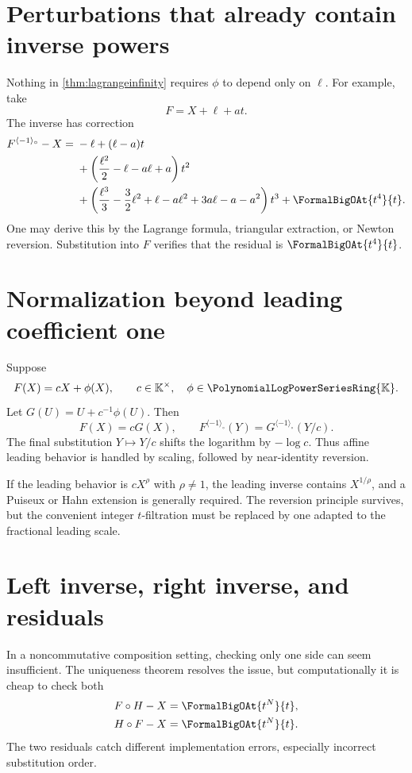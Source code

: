 \documentclass[11pt,oneside,openany]{book}
\newcommand{\K}{\mathbb{K}}
\newcommand{\Rring}{\PolynomialLogPowerSeriesRing{\K}}
\newcommand{\compose}{\mathbin{\circ}}
\newcommand{\rev}{^{\langle-1\rangle_{\circ}}}
\begin{document}
\section{Perturbations that already contain inverse powers}
Nothing in \cref{thm:lagrangeinfinity} requires \(\phi\) to depend only on
\(\ell\).  For example, take
\begin{equation}\label{eq:phiwitha}
 F=X+\ell+a t.
\end{equation}
The inverse has correction
\begin{align}
 F\rev-X={}&-\ell+(\ell-a)t\notag\\
 &+\left(\frac{\ell^2}{2}-\ell-a\ell+a\right)t^2\notag\\
 &+\left(
   \frac{\ell^3}{3}-\frac32\ell^2+\ell
   -a\ell^2+3a\ell-a-a^2
   \right)t^3
 +\FormalBigOAt{t^4}{t}.
 \label{eq:inversewitha}
\end{align}
One may derive this by the Lagrange formula, triangular extraction, or Newton
reversion.  Substitution into \(F\) verifies that the residual is
\(\FormalBigOAt{t^4}{t}\).

\section{Normalization beyond leading coefficient one}
Suppose
\begin{equation}\label{eq:affineleading}
 F(X)=cX+\phi(X),
 \qquad c\in\K^\times,
 \quad \phi\in\Rring.
\end{equation}
Let \(G(U)=U+c^{-1}\phi(U)\).  Then
\[
 F(X)=cG(X),
 \qquad
 F\rev(Y)=G\rev(Y/c).
\]
The final substitution \(Y\mapsto Y/c\) shifts the logarithm by
\(-\log c\).  Thus affine leading behavior is handled by scaling, followed by
near-identity reversion.

If the leading behavior is \(cX^\rho\) with \(\rho\neq1\), the leading inverse
contains \(X^{1/\rho}\), and a Puiseux or Hahn extension is generally required.
The reversion principle survives, but the convenient integer \(t\)-filtration
must be replaced by one adapted to the fractional leading scale.

\section{Left inverse, right inverse, and residuals}
In a noncommutative composition setting, checking only one side can seem
insufficient.  The uniqueness theorem resolves the issue, but computationally
it is cheap to check both
\begin{align}
 F\compose H-X&=\FormalBigOAt{t^N}{t},
 \label{eq:rightresidual}\\
 H\compose F-X&=\FormalBigOAt{t^N}{t}.
 \label{eq:leftresidual}
\end{align}
The two residuals catch different implementation errors, especially incorrect
substitution order.
\end{document}
